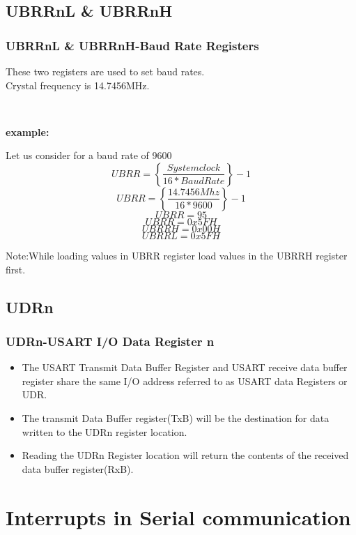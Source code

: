 \documentclass[table,10pt,red]{beamer}	%
\begin{document}
\subsection{UBRRnL \& UBRRnH}
	\begin{frame}[shrink]
	\frametitle{UBRRnL \& UBRRnH-Baud Rate Registers}
	\begin{Large}These two registers are used to set baud rates.\\ Crystal frequency is 14.7456MHz.\end{Large}	
	\pause	\\
	\begin{block}{\textbf{example:}}
			
		 Let us consider for a baud rate of 9600 \\
		 $$UBRR=\left\{\frac{System clock}{16*Baud Rate}\right\}-1$$		
		 $$UBRR=\left\{\frac{14.7456Mhz}{16*9600}\right\}-1$$
		 $$UBRR=95$$
		 $$UBRR=0x5FH$$
		 $$UBRRH=0x00H$$
		 $$UBRRL=0x5FH$$		
	\end{block}
	\begin{Large}Note:While loading values in UBRR register load values in the UBRRH register first.\end{Large}
				
	\end{frame}
	
\subsection{UDRn}
	\begin{frame}
	\frametitle{UDRn-USART I/O Data Register n}
	\begin{itemize}
		\item <+-|alert@+> The USART Transmit Data Buffer Register and USART receive data buffer register share the same I/O address referred to as USART data Registers or UDR.
		\item <+-|alert@+> The transmit Data Buffer register(TxB) will be the destination for data written to the UDRn register location.
		\item <+-|alert@+> Reading the UDRn Register location will return the contents of the received data buffer register(RxB).
	\end{itemize}
	\end{frame}


\section{Interrupts in Serial communication}
\end{document}
